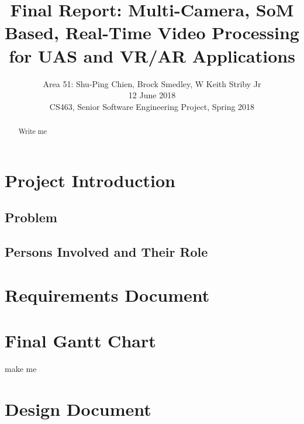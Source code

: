 \documentclass[letterpaper,10pt,serif,draftclsnofoot,onecolumn,compsoc,titlepage]{IEEEtran}
\title{Final Report: Multi-Camera, SoM Based, Real-Time Video Processing for UAS and VR/AR Applications}
\author{Area 51: Shu-Ping Chien, Brock Smedley, W Keith Striby Jr \\ 12 June 2018 \\ CS463, Senior Software Engineering Project, Spring 2018}
\begin{document}
\begin{titlepage}
\maketitle

\begin{abstract}

Write me \\


\thispagestyle{empty}
\end{abstract}
\end{titlepage}

\newpage
\tableofcontents

\newpage

\section{Project Introduction}

\subsection{Problem}

\subsection{Persons Involved and Their Role}

\newpage 

\section{Requirements Document}


\newpage

\section{Final Gantt Chart}

make me\\

\newpage

\section{Design Document}
\end{document}
